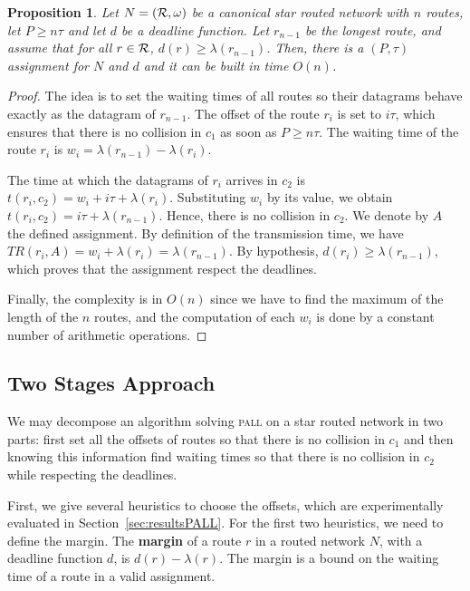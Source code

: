 \documentclass[a4paper,10pt]{journal}
\newtheorem{proposition}{Proposition}
\newcommand\pall{\textsc{pall}\xspace}
\begin{document}
	 \begin{proposition}\label{prop:asym}
	Let $N = ({\cal R}, \omega)$ be a canonical star routed network with $n$ routes, let $P \geq n\tau$ and let $d$ be a deadline function. Let $r_{n-1}$ be the longest route, and assume that for all $r\in {\cal R}$, $d(r) \geq \lambda(r_{n-1})$. Then, there is a $(P,\tau)$ assignment for $N$ and $d$ and it can be built in time $O(n)$.
	 \end{proposition}
      \begin{proof}
       The idea is to set the waiting times of all routes so their datagrams behave exactly as the datagram of $r_{n-1}$. The offset of the route $r_i$ is set to $i\tau$, which ensures that there is no collision in $c_1$ as soon as $P \geq n\tau$. The waiting time of the route $r_i$ is $w_i = \lambda(r_{n-1}) - \lambda(r_{i})$.
        
    The time at which the datagrams of $r_i$ arrives in $c_2$ is $t(r_i, c_2) = w_i + i\tau + \lambda(r_{i})$. Substituting $w_i$ by its value, we obtain $t(r_i, c_2) =  i\tau + \lambda(r_{n-1})$.
    Hence, there is no collision in $c_2$. We denote by $A$ the defined assignment. By definition of the transmission time, we have $TR(r_i,A) = w_i + \lambda(r_i) = \lambda(r_{n-1})$. By hypothesis, $d(r_i) \geq \lambda(r_{n-1})$, which proves that the assignment respect the deadlines.

	Finally, the complexity is in $O(n)$ since we have to find the maximum of the length of the $n$ routes, and the computation of each $w_i$ is done by a constant number of arithmetic operations.
     \end{proof}
     
    
     \subsection{Two Stages Approach}
     
      We may decompose an algorithm solving \pall on a star routed network in two parts: first set all the offsets of routes so that there is no collision in $c_1$ and then knowing this information find waiting times so that there is no collision in $c_2$ while respecting the deadlines. 
      
     First, we give several heuristics to choose the offsets, which are experimentally evaluated in Section~\ref{sec:resultsPALL}. 
     For the first two heuristics, we need to define the margin. The \textbf{margin} of a route $r$ in a routed network $N$, with a deadline function $d$, is $ d(r) - \lambda(r)$. The margin is a bound on the waiting time of a route in a valid assignment.
\end{document}
